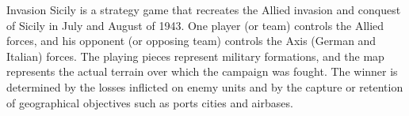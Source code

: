 Invasion Sicily is a strategy game that recreates the Allied invasion and conquest of Sicily in July and August of 1943. One player (or team) controls the Allied forces, and his opponent (or opposing team) controls the Axis (German and Italian) forces. The playing pieces represent military formations, and the map represents the actual terrain over which the campaign was fought. The winner is determined by the losses inflicted on enemy units and by the capture or retention of geographical objectives such as ports cities and airbases.